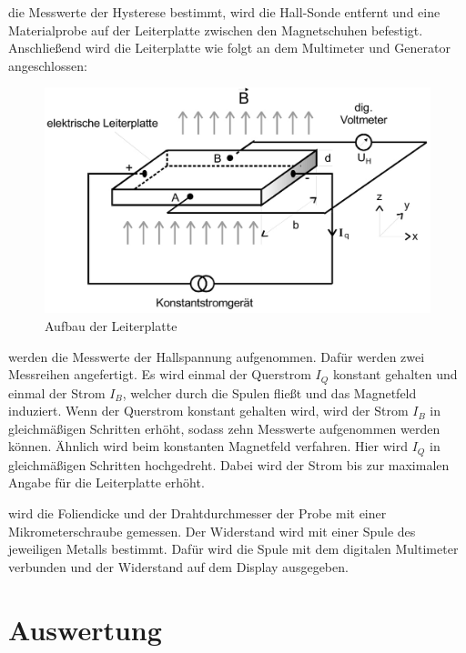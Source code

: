 \justifying die Messwerte der Hysterese bestimmt, wird die Hall-Sonde entfernt und eine Materialprobe auf der 
Leiterplatte zwischen den Magnetschuhen befestigt. Anschließend wird die Leiterplatte wie folgt an dem Multimeter und Generator angeschlossen:

\begin{figure}[H]
    \centering
    \includegraphics[width=\linewidth]{./images/leiterplatte.jpg}
    \caption{Aufbau der Leiterplatte \cite{V311}}
    \label{fig:1}
\end{figure}

\justifying werden die Messwerte der Hallspannung aufgenommen. Dafür werden zwei Messreihen angefertigt. Es wird einmal 
der Querstrom $I_Q$ konstant gehalten und einmal der Strom $I_B$, welcher durch die Spulen fließt und das Magnetfeld
induziert. Wenn der Querstrom konstant gehalten wird, wird der Strom $I_B$ in 
gleichmäßigen Schritten erhöht, sodass zehn Messwerte aufgenommen werden können. Ähnlich wird beim konstanten
Magnetfeld verfahren. Hier wird $I_Q$ in gleichmäßigen Schritten hochgedreht. Dabei wird der Strom
bis zur maximalen Angabe für die Leiterplatte erhöht.

\justifying wird die Foliendicke und der Drahtdurchmesser der Probe mit einer Mikrometerschraube gemessen. Der Widerstand wird 
mit einer Spule des jeweiligen Metalls bestimmt. Dafür wird die Spule mit dem digitalen Multimeter verbunden und
der Widerstand auf dem Display ausgegeben.



\section{Auswertung} \label{sec:5}

